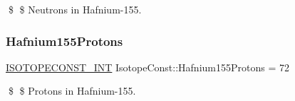 \$ \$ Neutrons in Hafnium-\/155. \mbox{\label{group___isotope_const-_hafnium-_hf155_ga7494dfb61ec47332d23f396824e2658e}} 
\subsubsection{\texorpdfstring{Hafnium155\+Protons}{Hafnium155Protons}}
{\footnotesize\ttfamily \mbox{\hyperlink{group___isotope_const-_macros_ga5f18360b3e99483a35c32d789e62621c}{I\+S\+O\+T\+O\+P\+E\+C\+O\+N\+S\+T\+\_\+\+I\+NT}} Isotope\+Const\+::\+Hafnium155\+Protons = 72}

\$ \$ Protons in Hafnium-\/155. 